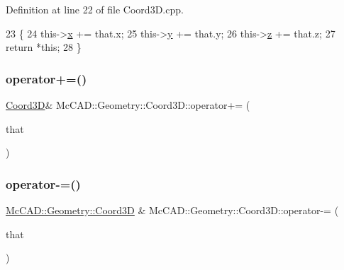 Definition at line 22 of file Coord3\+D.\+cpp.


\begin{DoxyCode}
23                             \{
24     this->\hyperlink{classMcCAD_1_1Geometry_1_1Coord3D_a82467d541e4e330484b7f4d589b433b4}{x} += that.x;
25     this->\hyperlink{classMcCAD_1_1Geometry_1_1Coord3D_af6512434da6e0242b2606e2341abc01d}{y} += that.y;
26     this->\hyperlink{classMcCAD_1_1Geometry_1_1Coord3D_a5f89140bda6825a0a21d0064d05d9f4b}{z} += that.z;
27     \textcolor{keywordflow}{return} *\textcolor{keyword}{this};
28 \}
\end{DoxyCode}
\mbox{\label{classMcCAD_1_1Geometry_1_1Coord3D_a58d10f2419c6e862bc7f2e79fba11dbb}} 
\subsubsection{\texorpdfstring{operator+=()}{operator+=()}\hspace{0.1cm}{\footnotesize\ttfamily [2/2]}}
{\footnotesize\ttfamily \hyperlink{classMcCAD_1_1Geometry_1_1Coord3D}{Coord3D}\& Mc\+C\+A\+D\+::\+Geometry\+::\+Coord3\+D\+::operator+= (\begin{DoxyParamCaption}\item[{const \hyperlink{classMcCAD_1_1Geometry_1_1Coord3D}{Coord3D} \&}]{that }\end{DoxyParamCaption})}

\mbox{\label{classMcCAD_1_1Geometry_1_1Coord3D_ad51281014f7c5275a2c03b26810d8086}} 
\subsubsection{\texorpdfstring{operator-\/=()}{operator-=()}\hspace{0.1cm}{\footnotesize\ttfamily [1/2]}}
{\footnotesize\ttfamily \hyperlink{classMcCAD_1_1Geometry_1_1Coord3D}{Mc\+C\+A\+D\+::\+Geometry\+::\+Coord3D} \& Mc\+C\+A\+D\+::\+Geometry\+::\+Coord3\+D\+::operator-\/= (\begin{DoxyParamCaption}\item[{const \hyperlink{classMcCAD_1_1Geometry_1_1Coord3D}{Coord3D} \&}]{that }\end{DoxyParamCaption})}



